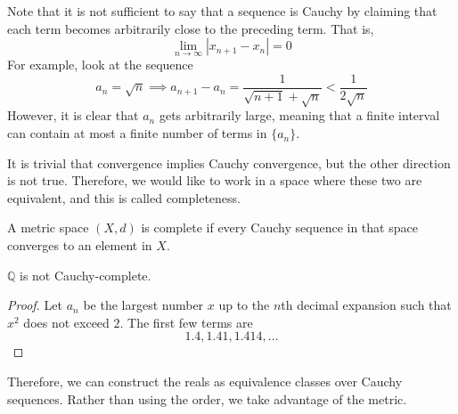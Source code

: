 \documentclass{article}
\begin{document}
      Note that it is not sufficient to say that a sequence is Cauchy by claiming that each term becomes arbitrarily close to the preceding term. That is, 
      \begin{equation}
        \lim_{n \rightarrow \infty} |x_{n+1} - x_{n}| = 0
      \end{equation}
      For example, look at the sequence 
      \begin{equation}
        a_n = \sqrt{n} \implies a_{n+1} - a_{n} = \frac{1}{\sqrt{n+1} + \sqrt{n}} < \frac{1}{2\sqrt{n}}
      \end{equation}
      However, it is clear that $a_n$ gets arbitrarily large, meaning that a finite interval can contain at most a finite number of terms in $\{a_n\}$. 

      It is trivial that convergence implies Cauchy convergence, but the other direction is not true. Therefore, we would like to work in a space where these two are equivalent, and this is called completeness. 

      \begin{definition}
        A metric space $(X, d)$ is complete if every Cauchy sequence in that space converges to an element in $X$. 
      \end{definition} 

      \begin{theorem}
        $\mathbb{Q}$ is not Cauchy-complete. 
      \end{theorem}
      \begin{proof}
        Let $a_n$ be the largest number $x$ up to the $n$th decimal expansion such that $x^2$ does not exceed $2$. The first few terms are 
        \begin{equation}
          1.4, 1.41, 1.414, \ldots
        \end{equation}
      \end{proof}

      Therefore, we can construct the reals as equivalence classes over Cauchy sequences. Rather than using the order, we take advantage of the metric. 
\end{document}
